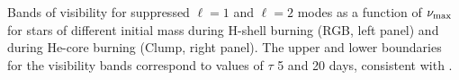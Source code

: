 \label{fig:visibility} Bands of visibility for suppressed $\ell=1$ and $\ell=2$ modes as a function of $\nu_{\rm max}$ for stars of different initial mass during H-shell burning (RGB, left panel) and during He-core burning (Clump, right panel). The upper and lower boundaries for the visibility bands correspond to values of $\tau$ 5 and 20 days, consistent with \cite{Dupret_2009,Corsaro_2015}. 